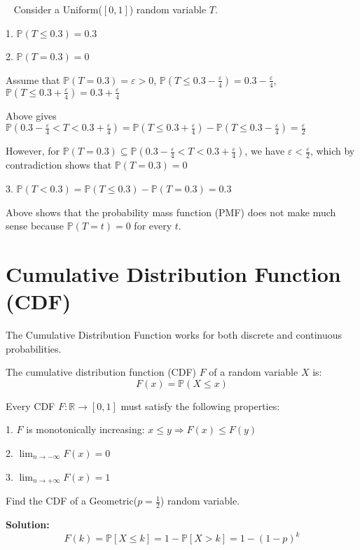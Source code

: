 \begin{eg}~ 
    Consider a Uniform(\([0, 1]\)) random variable \(T\). 

    1. \(\mathbb{P}(T \leq 0.3) = 0.3\) 

    2. \(\mathbb{P}(T = 0.3) = 0\)
        
    Assume that \(\mathbb{P}(T = 0.3) = \varepsilon > 0\), \(\mathbb{P}(T \leq 0.3 - \frac{\varepsilon}{4}) = 0.3 - \frac{\varepsilon}{4}\), \(\mathbb{P}(T \leq 0.3 + \frac{\varepsilon}{4}) = 0.3 + \frac{\varepsilon}{4}\)

    Above gives \(\mathbb{P}(0.3 - \frac{\varepsilon}{4} < T < 0.3 + \frac{\varepsilon}{4}) = \mathbb{P}(T \leq 0.3 + \frac{\varepsilon}{4}) - \mathbb{P}(T \leq 0.3 - \frac{\varepsilon}{4}) = \frac{\varepsilon}{2}\) 

    However, for \(\mathbb{P}(T = 0.3) \subseteq \mathbb{P}(0.3 - \frac{\varepsilon}{4} < T < 0.3 + \frac{\varepsilon}{4})\), we have \(\varepsilon < \frac{\varepsilon}{2}\), which by contradiction shows that \(\mathbb{P}(T = 0.3) = 0\)

    3. \(\mathbb{P}(T < 0.3) = \mathbb{P}(T \leq 0.3) - \mathbb{P}(T = 0.3) = 0.3\)
\end{eg}

Above shows that the probability mass function (PMF) does not make much sense because \(\mathbb{P}(T = t) = 0\) for every \(t\).

\section{Cumulative Distribution Function (CDF)}
The Cumulative Distribution Function works for both discrete and continuous probabilities.
\begin{definition}
  The cumulative distribution function (CDF) \(F\) of a random variable \(X\) is:
  \[
    F(x) = \mathbb{P}(X \leq x)
  \]
\end{definition}

Every CDF \(F:\mathbb{R} \to [0, 1]\) must satisfy the following properties:

1. \(F\) is monotonically increasing: \(x \leq y \Longrightarrow F(x) \leq F(y)\)

2. \(\lim_{n \to -\infty} F(x) = 0\) 

3. \(\lim_{n \to +\infty} F(x) = 1\) 

\begin{eg}
    Find the CDF of a Geometric(\(p = \frac{1}{2}\)) random variable.

    \textbf{Solution:} 
    \[
        F(k) = \mathbb{P}[X \leq k] = 1 - \mathbb{P}[X > k] = 1 - (1 - p)^k
    \]
\end{eg}

